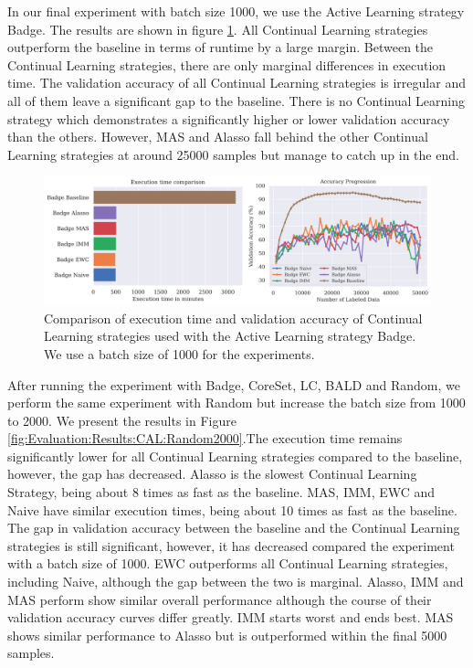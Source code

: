 In our final experiment with batch size 1000, we use the Active Learning strategy Badge. The results are shown in figure \ref{fig:Evaluation:Results:CAL:Badge1000}. All Continual Learning strategies
outperform the baseline in terms of runtime by a large margin. Between the Continual Learning strategies, there are only marginal differences in execution time. The validation accuracy of all Continual
Learning strategies is irregular and all of them leave a significant gap to the baseline. There is no Continual Learning strategy which demonstrates a significantly higher or lower validation accuracy
than the others. However, MAS and Alasso fall behind the other Continual Learning strategies at around 25000 samples but manage to catch up in the end. \par

\begin{figure}[h]
    \centering
    \includegraphics[width=\linewidth]{images/results_CAL/Badge_CAL_1000b.png}
    \caption[Continual Active Learning Badge 1000 batch size]{Comparison of execution time and validation accuracy of Continual Learning strategies used with the Active Learning strategy
    Badge. We use a batch size of 1000 for the experiments. }
    \label{fig:Evaluation:Results:CAL:Badge1000}
\end{figure}

After running the experiment with Badge, CoreSet, LC, BALD and Random, we perform the same experiment with Random but increase the batch size from 1000 to 2000. We present the results in
Figure \ref{fig:Evaluation:Results:CAL:Random2000}.The execution time remains significantly lower for all Continual Learning strategies compared to the baseline, however, the gap has decreased. 
Alasso is the slowest Continual Learning Strategy, being about 8 times as fast as the baseline. MAS, IMM, EWC and Naive have similar execution times, being about 10 times as fast as the baseline. 
The gap in validation accuracy between the baseline and the Continual Learning strategies is still significant, however, it has decreased compared the experiment with a batch size of 1000.
EWC outperforms all Continual Learning strategies, including Naive, although the gap between the two is marginal. Alasso, IMM and MAS perform show similar overall performance although the course
of their validation accuracy curves differ greatly. IMM starts worst and ends best. MAS shows similar performance to Alasso but is outperformed within the final 5000 samples. \par


